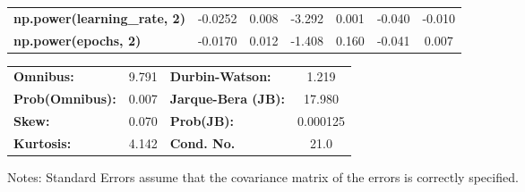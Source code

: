 \begin{center}
\begin{tabular}{lcccccc}
\textbf{np.power(learning\_rate, 2)} &      -0.0252  &        0.008     &    -3.292  &         0.001        &       -0.040    &       -0.010     \\
\textbf{np.power(epochs, 2)}         &      -0.0170  &        0.012     &    -1.408  &         0.160        &       -0.041    &        0.007     \\
\bottomrule
\end{tabular}
\begin{tabular}{lclc}
\textbf{Omnibus:}       &  9.791 & \textbf{  Durbin-Watson:     } &    1.219  \\
\textbf{Prob(Omnibus):} &  0.007 & \textbf{  Jarque-Bera (JB):  } &   17.980  \\
\textbf{Skew:}          &  0.070 & \textbf{  Prob(JB):          } & 0.000125  \\
\textbf{Kurtosis:}      &  4.142 & \textbf{  Cond. No.          } &     21.0  \\
\bottomrule
\end{tabular}
\end{center}

Notes: \newline
 [1] Standard Errors assume that the covariance matrix of the errors is correctly specified.